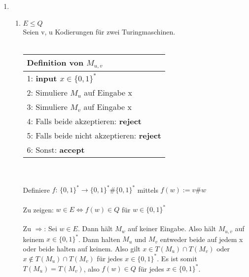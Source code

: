 \documentclass[12pt]{scrartcl}
\begin{document}
\exercise{}
\begin{enumerate}
    \item \begin{enumerate}
        \item $E \leq Q$\\
              Seien v, u Kodierungen für zwei Turingmaschinen.\\\\
              \begin{tabular}[h!]{l}
                \hline
                Definition von $M_{u, v}$\\\hline
                1: \textbf{input $x \in \{0,1\}^*$}\\
                2: Simuliere $M_u$ auf Eingabe x\\
                3: Simuliere $M_v$ auf Eingabe x\\
                4: Falls beide akzeptieren: \textbf{reject}\\
                5: Falls beide nicht akzeptieren: \textbf{reject}\\
                6: Sonst: \textbf{accept}\\\hline
              \end{tabular}\\\\
              Definiere $f: \, \{0,1\}^* \rightarrow \{0,1\}^* \# \{0,1\}^*$ mittels $f(w) := v\#w$\\\\
              Zu zeigen: $w \in E \Longleftrightarrow f(w) \in Q $ für $w \in \{0,1\}^*$\\\\
              Zu $\Rightarrow$: Sei $w \in E$. Dann hält $M_w$ auf keiner Eingabe. Also hält 
              $M_{u,v}$ auf keinem $x \in \{0,1\}^*$. Dann halten $M_u$ und $M_v$ entweder beide auf jedem x oder beide halten auf keinem.
               Also gilt $x \in T(M_u) \cap T(M_v)$ oder $x \notin T(M_u) \cap T(M_v)$ für jedes $x \in \{0,1\}^*$. Es ist somit
               $ T(M_u) = T(M_v)$, also $f(w) \in Q$ für jedes $x \in \{0,1\}^*$.\\
 

\end{enumerate}
\end{enumerate}
\end{document}
